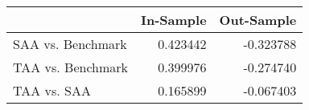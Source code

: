 \begin{tabular}{lrr}
\toprule
{} &  In-Sample &  Out-Sample \\
\midrule
SAA vs. Benchmark &   0.423442 &   -0.323788 \\
TAA vs. Benchmark &   0.399976 &   -0.274740 \\
TAA vs. SAA       &   0.165899 &   -0.067403 \\
\bottomrule
\end{tabular}
